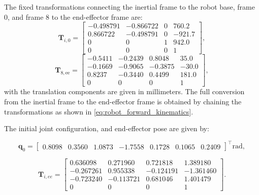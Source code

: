 The fixed transformations connecting the inertial frame to the robot base, frame 0, and frame 8 to the end-effector frame are:
\begin{equation}
    \mathbf{T}_{i,0} = 
    \begin{bmatrix}
        -0.498791 & -0.866722 & 0 & 760.2 \\
        0.866722 & -0.498791 & 0 & -921.7 \\
        0 & 0 & 1 & 942.0 \\
        0 & 0 & 0 & 1
    \end{bmatrix},
    \label{eq:robot-base-transform}
\end{equation}
\begin{equation}
    \mathbf{T}_{\mathrm{8,ee}} = 
    \begin{bmatrix}
        -0.5411 & -0.2439 & 0.8048 & 35.0 \\
        -0.1669 & -0.9065 & -0.3875 & -30.0 \\
        0.8237 & -0.3440 & 0.4499 & 181.0 \\
        0 & 0 & 0 & 1
    \end{bmatrix},
    \label{eq:robot-tool-transform}
\end{equation}
with the translation components are given in millimeters.
The full conversion from the inertial frame to the end-effector frame is obtained by chaining the transformations as shown in \cref{eq:robot_forward_kinematics}.

The initial joint configuration, and end-effector pose are given by:

\begin{equation}
    \mathbf{q}_0 = 
    \begin{bmatrix}
        0.8098 & 0.3560 & 1.0873 & -1.7558 & 0.1728 & 0.1065 & 0.2409
    \end{bmatrix}^\top \text{rad},
\end{equation}

\begin{equation}
    \mathbf{T}_{i,ee} =
    \begin{bmatrix}
        0.636098 & 0.271960 & 0.721818 & 1.389180 \\
        -0.267261 & 0.955338 & -0.124191 & -1.361460 \\
        -0.723240 & -0.113721 & 0.681046 & 1.401479 \\
        0 & 0 & 0 & 1
    \end{bmatrix}.
\end{equation}


